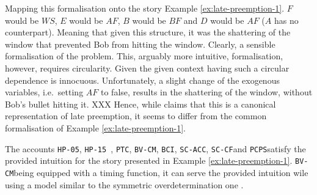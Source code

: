 \documentclass[11pt,a4paper]{book}
\theoremstyle{definition}
\theoremstyle{definition}
\theoremstyle{definition}
\theoremstyle{remark}
\newcommand{\hpu}{\texttt{HP-05}}
\newcommand{\ptc}{\texttt{PTC}}
\newcommand{\hpm}{\texttt{HP-15 }}
\newcommand{\bvcm}{\texttt{BV-CM}}
\newcommand{\bci}{\texttt{BCI}}
\newcommand{\scacc}{\texttt{SC-ACC}}
\newcommand{\pcps}{\texttt{PCPS}}
\newcommand{\sccf}{\texttt{SC-CF}}
\begin{document}
\begin{center}
\end{center}

Mapping this formalisation onto the story Example \ref{ex:late-preemption-1}. $F$ would be $WS$, $E$ would be $AF$, $B$ would be $BF$ and $D$ would be $AF$ ($A$ has no counterpart).
Meaning that given this structure, it was the shattering of the window that prevented Bob from hitting the window. Clearly, a sensible formalisation of the problem.
This, arguably more intuitive, formalisation, however, requires circularity. Given the given context having such a circular dependence is innocuous. Unfortunately, a slight 
change of the exogenous variables, i.e.\ setting $AF$ to false, results in the shattering of the window, without Bob's bullet hitting it. XXX
Hence, while \parencite{baumgartner2013regularity} claims that this is a canonical representation of late preemption, it seems to differ from the common formalisation of Example \ref{ex:late-preemption-1}.


The accounts \hpu, \hpm, \ptc, \bvcm, \bci, \scacc, \sccf and \pcps satisfy the provided intuition for the story presented in Example \ref{ex:late-preemption-1}. \parencite[p.~33]{beckers2018principled,bochman2018actual,denecker2018causal,weslake2015partial,khannecessary,halpern2016actual}
\bvcm being equipped with a timing function, it can serve the provided intuition wile using a model similar to the symmetric overdetermination one \parencite{beckers2018principled}.
\end{document}
